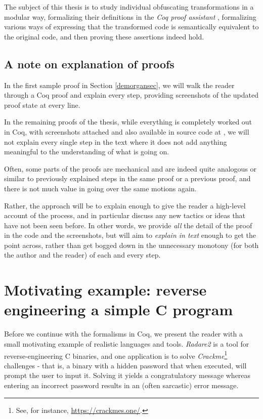 \documentclass[12pt,notitlepage]{report}
\theoremstyle{plain}
\theoremstyle{definition}
\newcommand{\define}[1]{\emph{#1}\index{#1}}
\numberwithin{equation}{section}
\begin{document}
\par The subject of this thesis is to study individual obfuscating transformations in a modular way, formalizing their definitions in the \emph{Coq proof assistant} \cite{Coq}, formalizing various ways of expressing that the transformed code is semantically equivalent to the original code, and then proving these assertions indeed hold.


\subsection*{A note on explanation of proofs}\label{proofexplain}
In the first sample proof in Section \ref{demorgansec}, we will walk the reader through a Coq proof and explain every step, providing screenshots of the updated proof state at every line.
\par In the remaining proofs of the thesis, while everything is completely worked out in Coq, with screenshots attached and also available in source code at \cite{repo}, we will not explain every single step in the text where it does not add anything meaningful to the understanding of what is going on.
\par Often, some parts of the proofs are mechanical and are indeed quite analogous or similar to previously explained steps in the same proof or a previous proof, and there is not much value in going over the same motions again.
\par Rather, the approach will be to explain enough to give the reader a high-level account of the process, and in particular discuss any new tactics or ideas that have not been seen before.  In other words, we provide \emph{all} the detail of the proof in the code and the screenshots, but will aim to \emph{explain in text} enough to get the point across, rather than get bogged down in the unnecessary monotony (for both the author and the reader) of each and every step.

\section{Motivating example: reverse engineering a simple C program}\label{motivating}

Before we continue with the formalisms in Coq, we present the reader with a small motivating example of realistic languages and tools.  \define{Radare2} \cite{R2} is a tool for reverse-engineering C binaries, and one application is to solve \define{Crackme}\footnote{See, for instance, \href{https://crackmes.one/}{https://crackmes.one/}.} challenges - that is, a binary with a hidden password that when executed, will prompt the user to input it.  Solving it yields a congratulatory message whereas entering an incorrect password results in an (often sarcastic) error message.
\end{document}
